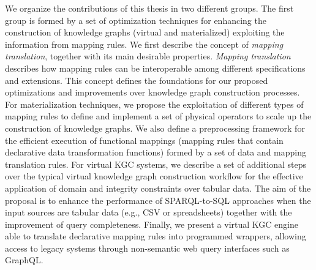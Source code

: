 We organize the contributions of this thesis in two different groups. The first group is formed by a set of optimization techniques for enhancing the construction of knowledge graphs (virtual and materialized) exploiting the information from mapping rules. We first describe the concept of \textit{mapping translation}, together with its main desirable properties. \textit{Mapping translation} describes how mapping rules can be interoperable among different specifications and extensions. This concept defines the foundations for our proposed optimizations and improvements over knowledge graph construction processes. For materialization techniques, we propose the exploitation of different types of mapping rules to define and implement a set of physical operators to scale up the construction of knowledge graphs. We also define a preprocessing framework for the efficient execution of functional mappings (mapping rules that contain declarative data transformation functions) formed by a set of data and mapping translation rules. For virtual KGC systems, we describe a set of additional steps over the typical virtual knowledge graph construction workflow for the effective application of domain and integrity constraints over tabular data. The aim of the proposal is to enhance the performance of SPARQL-to-SQL approaches when the input sources are tabular data (e.g., CSV or spreadsheets) together with the improvement of query completeness. Finally, we present a virtual KGC engine able to translate declarative mapping rules into programmed wrappers, allowing access to legacy systems through non-semantic web query interfaces such as GraphQL.

